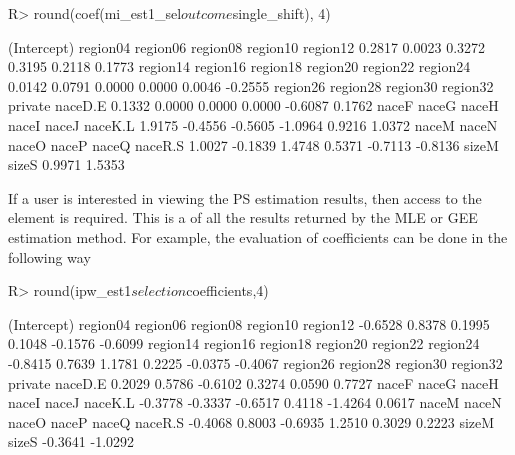 \documentclass[
]{jss}
\begin{document}
\begin{CodeChunk}
\begin{CodeInput}
R> round(coef(mi_est1_sel$outcome$single_shift), 4)
\end{CodeInput}
\begin{CodeOutput}
(Intercept)    region04    region06    region08    region10    region12 
     0.2817      0.0023      0.3272      0.3195      0.2118      0.1773 
   region14    region16    region18    region20    region22    region24 
     0.0142      0.0791      0.0000      0.0000      0.0046     -0.2555 
   region26    region28    region30    region32     private     naceD.E 
     0.1332      0.0000      0.0000      0.0000     -0.6087      0.1762 
      naceF       naceG       naceH       naceI       naceJ     naceK.L 
     1.9175     -0.4556     -0.5605     -1.0964      0.9216      1.0372 
      naceM       naceN       naceO       naceP       naceQ     naceR.S 
     1.0027     -0.1839      1.4748      0.5371     -0.7113     -0.8136 
      sizeM       sizeS 
     0.9971      1.5353 
\end{CodeOutput}
\end{CodeChunk}

If a user is interested in viewing the PS estimation results, then
access to the  element is required. This is a
 of all the results returned by the MLE or GEE estimation
method. For example, the evaluation of coefficients can be done in the
following way

\begin{CodeChunk}
\begin{CodeInput}
R> round(ipw_est1$selection$coefficients,4)
\end{CodeInput}
\begin{CodeOutput}
(Intercept)    region04    region06    region08    region10    region12 
    -0.6528      0.8378      0.1995      0.1048     -0.1576     -0.6099 
   region14    region16    region18    region20    region22    region24 
    -0.8415      0.7639      1.1781      0.2225     -0.0375     -0.4067 
   region26    region28    region30    region32     private     naceD.E 
     0.2029      0.5786     -0.6102      0.3274      0.0590      0.7727 
      naceF       naceG       naceH       naceI       naceJ     naceK.L 
    -0.3778     -0.3337     -0.6517      0.4118     -1.4264      0.0617 
      naceM       naceN       naceO       naceP       naceQ     naceR.S 
    -0.4068      0.8003     -0.6935      1.2510      0.3029      0.2223 
      sizeM       sizeS 
    -0.3641     -1.0292 
\end{CodeOutput}
\end{CodeChunk}
\end{document}
